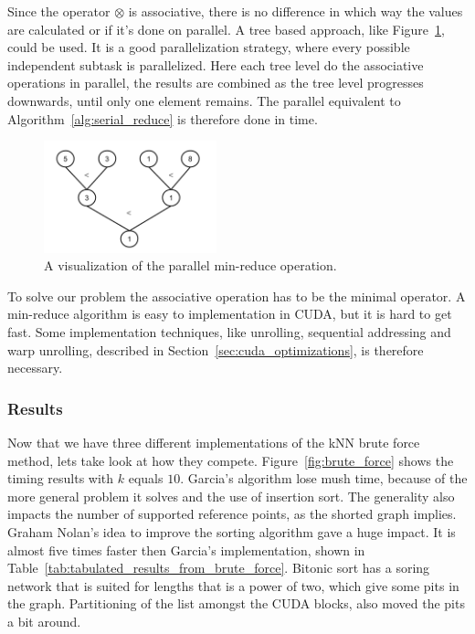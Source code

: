 Since the operator $\otimes$ is associative, there is no difference in which way the values are calculated or if it's done on parallel. A tree based approach, like Figure~\ref{fig:paralell_reduce_operation}, could be used. It is a good parallelization strategy, where every possible independent subtask is parallelized. Here each tree level do the associative operations in parallel, the results are combined as the tree level progresses downwards, until only one element remains. The parallel equivalent to Algorithm~\ref{alg:serial_reduce} is therefore done in  time. 

\begin{figure}[ht!]
\centering
\includegraphics[width=50mm]{../gfx/min_reduce.png}

\caption{A visualization of the parallel min-reduce operation.}
\label{fig:paralell_reduce_operation}
\end{figure}

To solve our problem the associative operation has to be the minimal operator. A min-reduce algorithm is easy to implementation in CUDA, but it is hard to get fast. Some implementation techniques, like unrolling, sequential addressing and warp unrolling, described in Section~\ref{sec:cuda_optimizations}, is therefore necessary.   

\subsubsection{Results} %
\label{ssub:comparison}

Now that we have three different implementations of the kNN brute force method, lets take look at how they compete. Figure~\ref{fig:brute_force} shows the timing results with $k$ equals $10$. Garcia's algorithm lose mush time, because of the more general problem it solves and the use of insertion sort. The generality also impacts the number of supported reference points, as the shorted graph implies. Graham Nolan's idea to improve the sorting algorithm gave a huge impact. It is almost five times faster then Garcia's implementation, shown in Table~\ref{tab:tabulated_results_from_brute_force}. Bitonic sort has a soring network that is suited for lengths that is a power of two, which give some pits in the graph. Partitioning of the list amongst the CUDA blocks, also moved the pits a bit around.  


